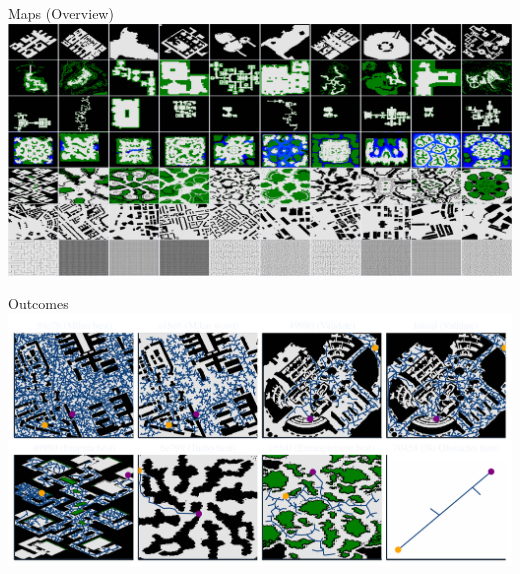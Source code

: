 \documentclass[aspectratio=169]{beamer}
\begin{document}
\begin{frame}{Maps (Overview)}
    \includegraphics[width=1.0\linewidth, keepaspectratio]{figures/show_maps_overview.pdf}
\end{frame}

\begin{frame}{Outcomes}
    \includegraphics[width=1.0\linewidth, keepaspectratio]{figures/learned.pdf}
\end{frame}
\end{document}
